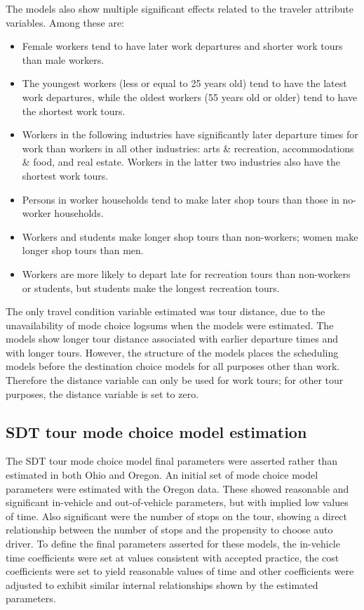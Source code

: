 The models also show multiple significant effects related to the traveler attribute variables. Among these are:
\begin{itemize}
\item Female workers tend to have later work departures and shorter work tours than male workers.
\item The youngest workers (less or equal to 25 years old) tend to have the latest work departures, while the oldest workers (55 years old or older) tend to have the shortest work tours.
\item Workers in the following industries have significantly later departure times for work than workers in all other industries:  arts \& recreation, accommodations \& food, and real estate. Workers in the latter two industries also have the shortest work tours.
\item Persons in worker households tend to make later shop tours than those in no-worker households.
\item Workers and students make longer shop tours than non-workers; women make longer shop tours than men.
\item Workers are more likely to depart late for recreation tours than non-workers or students, but students make the longest recreation tours.
\end{itemize}

The only travel condition variable estimated was tour distance, due to the unavailability of mode choice logsums when the models were estimated. The models show longer tour distance associated with earlier departure times and with longer tours. However, the structure of the models places the scheduling models before the destination choice models for all purposes other than work. Therefore the distance variable can only be used for work tours; for other tour purposes, the distance variable is set to zero. 

\subsection{SDT tour mode choice model estimation}
The SDT tour mode choice model final parameters were asserted rather than estimated in both Ohio and Oregon. An initial set of mode choice model parameters were estimated with the Oregon data. These showed reasonable and significant in-vehicle and out-of-vehicle parameters, but with implied low values of time. Also significant were the number of stops on the tour, showing a direct relationship between the number of stops and the propensity to choose auto driver. To define the final parameters asserted for these models, the in-vehicle time coefficients were set at values consistent with accepted practice, the cost coefficients were set to yield reasonable values of time and other coefficients were adjusted to exhibit similar internal relationships shown by the estimated parameters.

